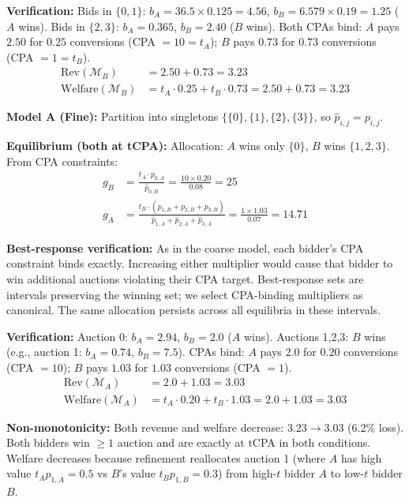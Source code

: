 \documentclass{article}
\theoremstyle{plain}
\theoremstyle{definition}
\theoremstyle{remark}
\newcommand{\cM}{\mathcal{M}}
\begin{document}
\textbf{Verification:} Bids in $\{0,1\}$: $b_A = 36.5 \times 0.125 = 4.56$, $b_B = 6.579 \times 0.19 = 1.25$ ($A$ wins). Bids in $\{2,3\}$: $b_A = 0.365$, $b_B = 2.40$ ($B$ wins). Both CPAs bind: $A$ pays $2.50$ for $0.25$ conversions (CPA $= 10 = t_A$); $B$ pays $0.73$ for $0.73$ conversions (CPA $= 1 = t_B$).
\begin{align}
\text{Rev}(\cM_B) &= 2.50 + 0.73 = 3.23 \\
\text{Welfare}(\cM_B) &= t_A \cdot 0.25 + t_B \cdot 0.73 = 2.50 + 0.73 = 3.23
\end{align}

\textbf{Model A (Fine):} Partition into singletons $\{\{0\}, \{1\}, \{2\}, \{3\}\}$, so $\hat{p}_{i,j} = p_{i,j}$.

\textbf{Equilibrium (both at tCPA):} Allocation: $A$ wins only $\{0\}$, $B$ wins $\{1,2,3\}$. From CPA constraints:
\begin{align}
g_B &= \frac{t_A \cdot p_{0,A}}{\hat{p}_{0,B}} = \frac{10 \times 0.20}{0.08} = 25 \\
g_A &= \frac{t_B \cdot (p_{1,B} + p_{2,B} + p_{3,B})}{\hat{p}_{1,A} + \hat{p}_{2,A} + \hat{p}_{3,A}} = \frac{1 \times 1.03}{0.07} = 14.71
\end{align}

\textbf{Best-response verification:} As in the coarse model, each bidder's CPA constraint binds exactly. Increasing either multiplier would cause that bidder to win additional auctions violating their CPA target. Best-response sets are intervals preserving the winning set; we select CPA-binding multipliers as canonical. The same allocation persists across all equilibria in these intervals.

\textbf{Verification:} Auction 0: $b_A = 2.94$, $b_B = 2.0$ ($A$ wins). Auctions 1,2,3: $B$ wins (e.g., auction 1: $b_A = 0.74$, $b_B = 7.5$). CPAs bind: $A$ pays $2.0$ for $0.20$ conversions (CPA $= 10$); $B$ pays $1.03$ for $1.03$ conversions (CPA $= 1$).
\begin{align}
\text{Rev}(\cM_A) &= 2.0 + 1.03 = 3.03 \\
\text{Welfare}(\cM_A) &= t_A \cdot 0.20 + t_B \cdot 1.03 = 2.0 + 1.03 = 3.03
\end{align}

\textbf{Non-monotonicity:} Both revenue and welfare decrease: $3.23 \to 3.03$ (6.2\% loss). Both bidders win $\geq 1$ auction and are exactly at tCPA in both conditions. Welfare decreases because refinement reallocates auction 1 (where $A$ has high value $t_A p_{1,A} = 0.5$ vs $B$'s value $t_B p_{1,B} = 0.3$) from high-$t$ bidder $A$ to low-$t$ bidder $B$.
\end{document}
